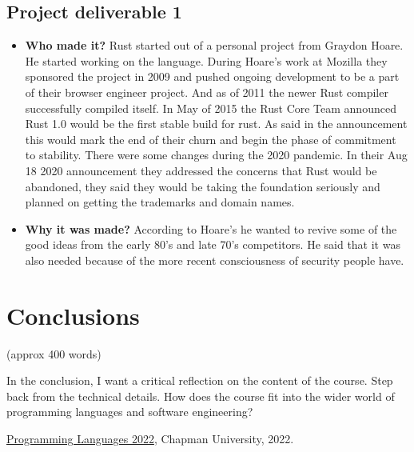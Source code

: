 \documentclass{article}
\theoremstyle{theorem}
\theoremstyle{definition}
\theoremstyle{remark}
\begin{document}
\subsection{Project deliverable 1 }
    \begin{itemize}

\item \textbf{Who made it?}  Rust started out of a personal project from Graydon Hoare. He started working on the language. During Hoare’s work at Mozilla they sponsored the project in 2009 and pushed ongoing development to be a part of their browser engineer project. And as of 2011 the newer Rust compiler successfully compiled itself.  In May of 2015 the Rust Core Team announced Rust 1.0 would be the first stable build for rust. As said in the announcement this would mark the end of their churn and begin the phase of commitment to stability. There were some changes during the 2020 pandemic. In their Aug 18 2020 announcement they addressed the concerns that Rust would be abandoned, they said they would be taking the foundation seriously and planned on getting the trademarks and domain names. 
\item \textbf{Why it was made?}  According to Hoare’s he wanted to revive some of the good ideas from the early 80’s and late 70’s competitors. He said that it was also needed because of the more recent consciousness of security people have.

\end{itemize}
\section{Conclusions}\label{conclusions}

(approx 400 words)

In the conclusion, I want a critical reflection on the content of the course. Step back from the technical details. How does the course fit into the wider world of programming languages and software engineering?

\begin{thebibliography}{99}
 \href{https://github.com/alexhkurz/programming-languages-2022/blob/main/README.md}{Programming Languages 2022}, Chapman University, 2022.
\end{thebibliography}
\end{document}
